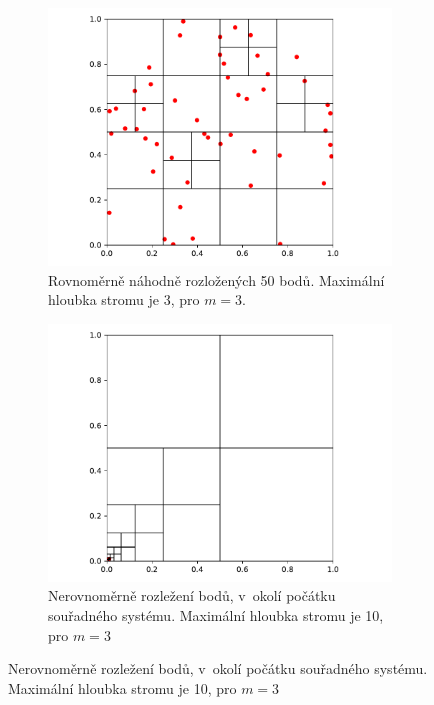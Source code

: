\begin{figure}[b!]
     \centering
     \begin{subfigure}[b]{0.45\textwidth}
         \centering
         \includegraphics[width=\textwidth]{obrazky-figures/octree/octree-good.pdf}
         \caption{Rovnoměrně náhodně rozložených 50 bodů. Maximální hloubka stromu je 3, pro $m = 3$.}
         \label{subfigure:50randompoints}
     \end{subfigure}
     \hfill
     \begin{subfigure}[b]{0.45\textwidth}
         \centering
         \includegraphics[width=\textwidth]{obrazky-figures/octree/octree-bad.pdf}
         \caption{Nerovnoměrně rozležení bodů, v~okolí počátku souřadného systému. Maximální hloubka stromu je 10, pro $m = 3$}
     \end{subfigure}


\end{figure}
